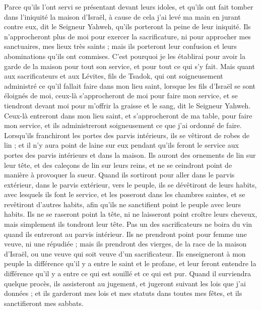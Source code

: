 \begin{multicols}{2}
Parce qu'ils l’ont servi se présentant devant leurs idoles, et qu'ils ont fait tomber dans l’iniquité la maison d'Israël, à cause de cela j'ai levé ma main en jurant contre eux, dit le Seigneur Yahweh, qu'ils porteront la peine de leur iniquité.
Ils n'approcheront plus de moi pour exercer la sacrificature, ni pour approcher mes sanctuaires, mes lieux très saints ; mais ils porteront leur confusion et leurs abominations qu’ils ont commises.
C'est pourquoi je les établirai pour avoir la garde de la maison pour tout son service, et pour tout ce qui s'y fait.
Mais quant aux sacrificateurs et aux Lévites, fils de Tsadok, qui ont soigneusement administré ce qu'il fallait faire dans mon lieu saint, lorsque les fils d'Israël se sont éloignés de moi, ceux-là s'approcheront de moi pour faire mon service, et se tiendront devant moi pour m'offrir la graisse et le sang, dit le Seigneur Yahweh.
Ceux-là entreront dans mon lieu saint, et s'approcheront de ma table, pour faire mon service, et ils administreront soigneusement ce que j'ai ordonné de faire.
Lorsqu’ils franchiront les portes des parvis intérieurs, ils se vêtiront de robes de lin ; et il n'y aura point de laine sur eux pendant qu'ils feront le service aux portes des parvis intérieurs et dans la maison.
Ils auront des ornements de lin sur leur tête, et des caleçons de lin sur leurs reins, et ne se ceindront point de manière à provoquer la sueur.
Quand ils sortiront pour aller dans le parvis extérieur, dans le parvis extérieur, vers le peuple, ils se dévêtiront de leurs habits, avec lesquels ils font le service, et les poseront dans les chambres saintes, et se revêtiront d'autres habits, afin qu'ils ne sanctifient point le peuple avec leurs habits.
Ils ne se raseront point la tête, ni ne laisseront point croître leurs cheveux, mais simplement ils tondront leur tête.
Pas un des sacrificateurs ne boira du vin quand ils entreront au parvis intérieur.
Ils ne prendront point pour femme une veuve, ni une répudiée ; mais ils prendront des vierges, de la race de la maison d'Israël, ou une veuve qui soit veuve d'un sacrificateur.
Ils enseigneront à mon peuple la différence qu'il y a entre le saint et le profane, et leur feront entendre la différence qu'il y a entre ce qui est souillé et ce qui est pur.
Quand il surviendra quelque procès, ils assisteront au jugement, et jugeront suivant les lois que j'ai données ; et ils garderont mes lois et mes statuts dans toutes mes fêtes, et ils sanctifieront mes sabbats.

\end{multicols}
